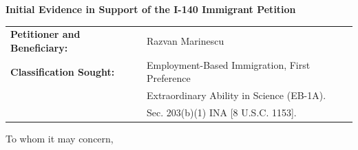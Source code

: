 \documentclass[11pt]{article}
\begin{document}
\sloppy


\vspace{4em}


\begin{center}
 \Large{\textbf{Initial Evidence in Support of the I-140 Immigrant Petition}}
\end{center}

\vspace{4em}


\begin{tabular}{ll}
\textbf{Petitioner and Beneficiary:} & Razvan Marinescu\\
\textbf{Classification Sought:} & Employment-Based Immigration, First Preference\\
& Extraordinary Ability in Science (EB-1A).\\
& Sec. 203(b)(1) INA [8 U.S.C. 1153].\\
\end{tabular}

\vspace{2em}


To whom it may concern,

\vspace{2em}



\newcommand{\fie}{Artificial Intelligence in Medicine}
\newcommand{\dr}{Dr. Marinescu }
\newcommand{\drs}{Dr. Marinescu's }

\newcommand{\qu}[1]{\say{\emph{#1}}}

\newcommand{\pg}{(QR, Professor of EECS, MIT)\\}
\newcommand{\ty}{(UZ, Professor of Electrical and Computer Engineering, Univ A)\\}
\newcommand{\fb}{(GC, Professor of Neuroradiology, University of ABC)\\}
\newcommand{\se}{(TF, Professor of Neuropsychology, XYZ)\\}
\newcommand{\sh}{(TI, Vice President of M, Company XYZ, USA)\\}
\newcommand{\ch}{(DI, Senior Director of XYZ, Company ABC, USA)\\}
\newcommand{\eb}{(FC, Professor at UV)\\}
\end{document}
